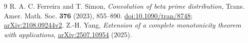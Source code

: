 \documentclass[11pt]{article}
\begin{document}
\begin{thebibliography}{9}
 R. A. C. Ferreira and T. Simon,
\emph{Convolution of beta prime distribution}, Trans. Amer. Math. Soc.
\textbf{376} (2023), 855--890.
\href{https://doi.org/10.1090/tran/8748}{doi:10.1090/tran/8748};
\href{https://arxiv.org/abs/2108.09244v2}{arXiv:2108.09244v2}.
 Z.-H. Yang, \emph{Extension of a complete monotonicity theorem
with applications}, \href{https://arxiv.org/abs/2507.10954}{arXiv:2507.10954}
(2025).
\end{thebibliography}
\end{document}
